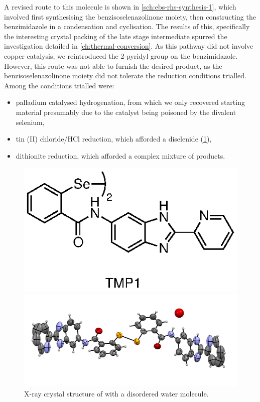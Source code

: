 \begin{refsection}
A revised route to this molecule is shown in \cref{sch:ebs-rhs-synthesis-1}, which involved first synthesising the benzisoselenazolinone moiety, then constructing the benzimidazole in a condensation and cyclisation.
The results of this, specifically the interesting crystal packing of the late stage intermediate  spurred the investigation detailed in \cref{ch:thermal-conversion}.
As this pathway did not involve copper catalysis, we reintroduced the 2-pyridyl group on the benzimidazole.
However, this route was not able to furnish the desired product, as the benzisoselenazolinone moiety did not tolerate the reduction conditions trialled.
Among the conditions trialled were:
\begin{itemize}
    \item palladium catalysed hydrogenation, from which we only recovered starting material presumably due to the catalyst being poisoned by the divalent selenium,
    \item tin (II) chloride/HCl reduction, which afforded a diselenide  (\cref{fig:diselenide-benzimidazole-2py-xray}),
    \item dithionite reduction, which afforded a complex mixture of products.
\end{itemize}

\begin{figure}
    \centering
    \includegraphics[scale=0.74]{Figures/ebs-rhs-diselenide.eps}

    \includegraphics[width=0.8\linewidth]{Figures/diselenide-benzimidazole-2py-xray.pdf}
    \caption[X-ray crystal structure of .]{X-ray crystal structure of  with a disordered water molecule.}\label{fig:diselenide-benzimidazole-2py-xray}
\end{figure}


\end{refsection}
